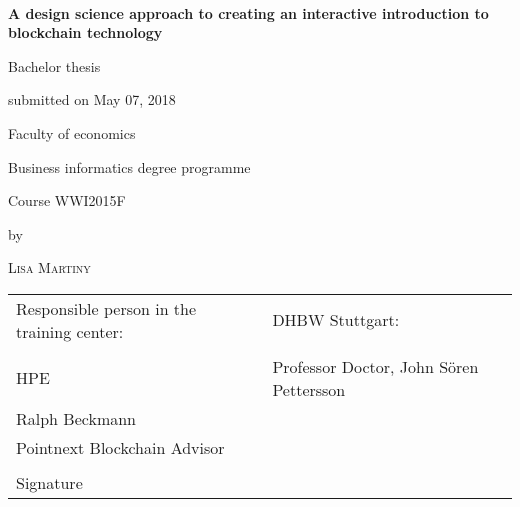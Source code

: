 \newcommand{\typMeinerArbeit}{Bachelor thesis} 

\newcommand{\themaMeinerArbeit}{A design science approach to creating an interactive introduction to blockchain technology}

\thispagestyle{empty}

\begin{spacing}{1}
\begin{center}	
~\vspace{0mm}

{\sffamily
\LARGE  
\textbf{A design science approach to creating an interactive introduction to blockchain technology}

}


\vspace{15mm}

{\Large \typMeinerArbeit}

\vspace{1cm}

submitted on May 07, 2018
\vspace{15mm}
\medskip

Faculty of economics
\medskip

Business informatics degree programme
\medskip

Course WWI2015F

\vspace{10mm}

by

\vspace{10mm}

{\large\textsc{Lisa Martiny}}

\vspace{10mm}
\end{center}

\vfill

\begin{tabular}{ll}
Responsible person in the training center: & DHBW Stuttgart: \\
\hspace{0.4\linewidth} & \\
HPE & Professor Doctor, John Sören Pettersson \\
Ralph Beckmann  &  \\
Pointnext Blockchain Advisor \\
\\
Signature \\
\end{tabular}


\vspace{1cm}
\end{spacing}

